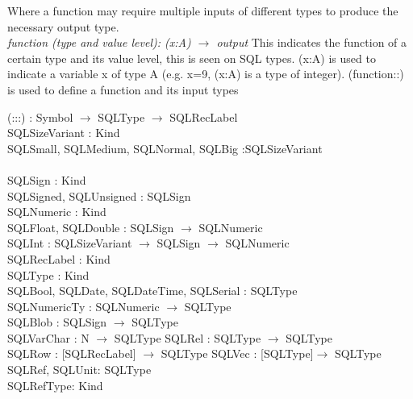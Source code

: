 \documentclass[12pt, svgnames]{article}
\begin{document}
{{Where a function may require multiple inputs of different types to produce the 
necessary output type.\\

\textit{function (type and value level): (x:A) $\rightarrow$ output}
This indicates the function of a certain type and its value level, this is seen 
on SQL types. (x:A) is used to indicate a variable x of type A (e.g. x=9, (x:A) 
is a type of integer). (function::) is used to define a function and its input 
types 




 (:::) : Symbol $\rightarrow$ SQLType $\rightarrow$ SQLRecLabel \\
 
 SQLSizeVariant : Kind \\
 SQLSmall, SQLMedium, SQLNormal, SQLBig :SQLSizeVariant \\ \\
 
 SQLSign : Kind \\
 SQLSigned, SQLUnsigned : SQLSign  \\
 
 SQLNumeric : Kind \\
 SQLFloat, SQLDouble : SQLSign $\rightarrow$ SQLNumeric \\
 
 SQLInt : SQLSizeVariant $\rightarrow$ SQLSign $\rightarrow$ SQLNumeric \\
 SQLRecLabel : Kind \\

 SQLType : Kind \\
 SQLBool, SQLDate, SQLDateTime, SQLSerial : SQLType \\
 
 SQLNumericTy : SQLNumeric $\rightarrow$ SQLType  \\
 SQLBlob : SQLSign $\rightarrow$ SQLType \\
 
 SQLVarChar : N $\rightarrow$ SQLType 
 SQLRel : SQLType $\rightarrow$ SQLType \\
 
 SQLRow : [SQLRecLabel] $\rightarrow$ SQLType 
 SQLVec : [SQLType]$\rightarrow$ SQLType \\
 
 SQLRef, SQLUnit: SQLType \\
 SQLRefType: Kind\\
 
}}
\end{document}
